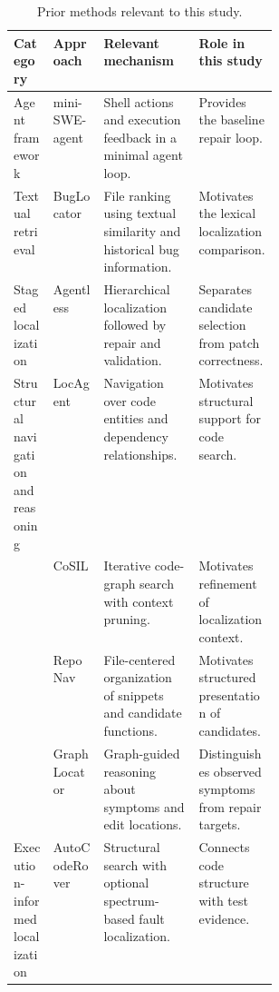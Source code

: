 \documentclass[11pt]{article}
\begin{document}
\begin{table}[H]
\centering
\small
\setlength{\tabcolsep}{3pt}
\renewcommand{\arraystretch}{1.18}
\caption{Prior methods relevant to this study.}
\label{tab:rw-positioning}

\begin{tabularx}{\linewidth}{
    @{}
    >{\raggedright\arraybackslash}p{0.15\linewidth}
    >{\raggedright\arraybackslash}p{0.19\linewidth}
    >{\raggedright\arraybackslash}X
    >{\raggedright\arraybackslash}X
    @{}
}
\toprule
Category & Approach & Relevant mechanism & Role in this study \\
\midrule

Agent framework
& mini-SWE-agent \cite{minisweagent}
& Shell actions and execution feedback in a minimal agent loop.
& Provides the baseline repair loop. \\

\midrule

Textual retrieval
& BugLocator \cite{zhou2012buglocator}
& File ranking using textual similarity and historical bug information.
& Motivates the lexical localization comparison. \\

\midrule

Staged localization
& Agentless \cite{xia2024agentless}
& Hierarchical localization followed by repair and validation.
& Separates candidate selection from patch correctness. \\

\midrule

Structural navigation and reasoning
& LocAgent \cite{chen2025locagent}
& Navigation over code entities and dependency relationships.
& Motivates structural support for code search. \\

& CoSIL \cite{jiang2025cosil}
& Iterative code-graph search with context pruning.
& Motivates refinement of localization context. \\

& RepoNav \cite{chai2026reponav}
& File-centered organization of snippets and candidate functions.
& Motivates structured presentation of candidates. \\

& GraphLocator \cite{liu2025graphlocator}
& Graph-guided reasoning about symptoms and edit locations.
& Distinguishes observed symptoms from repair targets. \\

\midrule

Execution-informed localization
& AutoCodeRover \cite{zhang2024autocoderover}
& Structural search with optional spectrum-based fault localization.
& Connects code structure with test evidence. \\


\end{tabularx}
\end{table}
\end{document}
